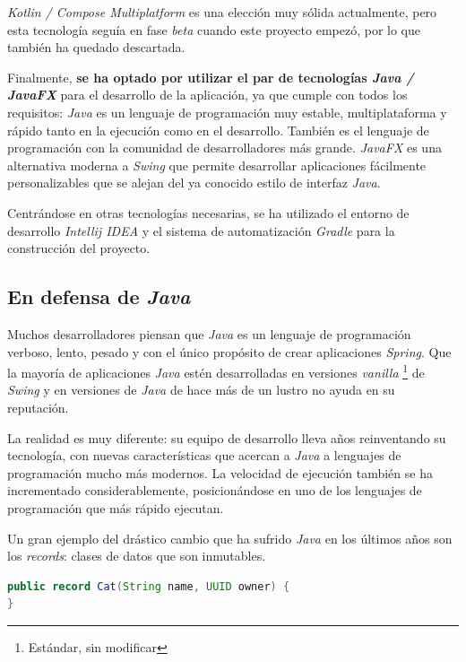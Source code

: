 \noindent \textit{Kotlin / Compose Multiplatform} es una elección muy sólida actualmente, pero esta
tecnología seguía en fase \textit{beta} cuando este proyecto empezó, por lo que también ha quedado
descartada.

\noindent Finalmente, \textbf{se ha optado por utilizar el par de tecnologías \textit{Java / JavaFX}}
para el desarrollo de la aplicación, ya que cumple con todos los requisitos: \textit{Java} es un
lenguaje de programación muy estable, multiplataforma y rápido tanto en la ejecución como en
el desarrollo.
También es el lenguaje de programación con la comunidad de desarrolladores más grande.
\textit{JavaFX} es una alternativa moderna a \textit{Swing} que permite desarrollar aplicaciones
fácilmente personalizables que se alejan del ya conocido estilo de interfaz \textit{Java}.

\noindent Centrándose en otras tecnologías necesarias, se ha utilizado el entorno de desarrollo
\textit{Intellij IDEA} y el sistema de automatización \textit{Gradle} para la construcción
del proyecto.

\subsection{En defensa de \textit{Java}}\label{subsec:en-defensa-de-java}

Muchos desarrolladores piensan que \textit{Java} es un lenguaje de programación verboso, lento, pesado
y con el único propósito de crear aplicaciones \textit{Spring}.
Que la mayoría de aplicaciones \textit{Java} estén desarrolladas en versiones \textit{vanilla}
\footnote{Estándar, sin modificar} de \textit{Swing} y en versiones de \textit{Java} de hace más
de un lustro no ayuda en su reputación.

\noindent La realidad es muy diferente: su equipo de desarrollo lleva años reinventando su tecnología,
con nuevas características que acercan a \textit{Java} a lenguajes de programación mucho más modernos.
La velocidad de ejecución también se ha incrementado considerablemente, posicionándose en uno de los
lenguajes de programación que más rápido ejecutan.

\noindent Un gran ejemplo del drástico cambio que ha sufrido \textit{Java} en los últimos años son los
\textit{records}: clases de datos que son inmutables.

\begin{lstlisting}[language=Java,style=java,frame=single,label={lst:java-comparacion-18}]
public record Cat(String name, UUID owner) {
}
\end{lstlisting}

